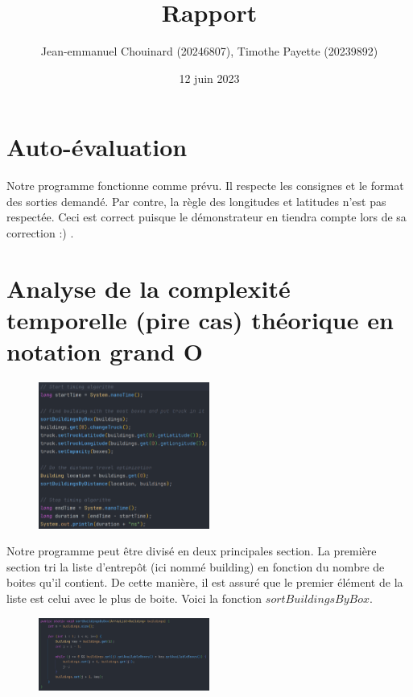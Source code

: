 \documentclass{article}
\title{Rapport}
\author{Jean-emmanuel Chouinard (20246807), Timothe Payette (20239892)}
\date{12 juin 2023}
\begin{document}
\maketitle

\section{Auto-évaluation}

Notre programme fonctionne comme prévu. Il respecte les consignes et le format des sorties demandé. Par contre, la règle des longitudes et latitudes n'est pas respectée. Ceci est correct puisque le démonstrateur en tiendra compte lors de sa correction :) .

\section{Analyse de la complexité temporelle (pire cas) théorique en notation grand O}

\begin{figure}[htp]
\centering
\includegraphics[width=0.5\textwidth]{algo.png}
\end{figure}

Notre programme peut être divisé en deux principales section. La première section tri la liste d'entrepôt (ici nommé building) en fonction du nombre de boites qu'il contient. De cette manière, il est assuré que le premier élément de la liste est celui avec le plus de boite. Voici la fonction $sortBuildingsByBox$.

\begin{figure}[htp]
\centering
\includegraphics[width=0.5\textwidth]{sortBuilding.png}
\end{figure}
\end{document}
